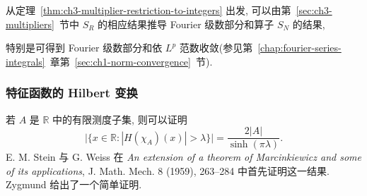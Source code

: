从定理~\ref{thm:ch3-multiplier-restriction-to-integers} 出发, 可以由第~\ref{sec:ch3-multipliers}~节中 $S_R$ 的相应结果推导 Fourier 级数部分和算子 $S_N$ 的结果,

\hypertarget{chapter-03-page-080}{}
特别是可得到 Fourier 级数部分和依 $L^p$ 范数收敛(参见第~\ref{chap:fourier-series-integrals}~章第~\ref{sec:ch1-norm-convergence}~节).

\subsubsection{特征函数的 Hilbert 变换}
\label{subsec:ch3-characteristic-function-hilbert-transform}

若 $A$ 是 $\mathbb R$ 中的有限测度子集, 则可以证明
\[
 \bigl|\{x\in\mathbb R:|H(\chi_A)(x)|>\lambda\}\bigr|
 =\frac{2|A|}{\sinh(\pi\lambda)}.
\]
E. M. Stein 与 G. Weiss 在 \emph{An extension of a theorem of Marcinkiewicz and some of its applications}, J. Math. Mech. 8 (1959), 263--284 中首先证明这一结果. Zygmund  给出了一个简单证明.
